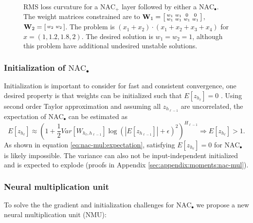\begin{figure}[h]
\caption{RMS loss curvature for a $\mathrm{NAC}_{+}$ layer followed by either a $\mathrm{NAC}_{\bullet}$. The weight matrices constrained are to $\mathbf{W}_1 = \left[\protect\begin{smallmatrix}
w_1 & w_1 & 0 & 0 \\
w_1 & w_1 & w_1 & w_1
\protect\end{smallmatrix}\right]$, $\mathbf{W}_2 = \left[\protect\begin{smallmatrix}
w_2 & w_2
\protect\end{smallmatrix}\right]$. The problem is $(x_1 + x_2) \cdot (x_1 + x_2 + x_3 + x_4)$ for $x = \left(1, 1.2, 1.8, 2\right)$. The desired solution is $w_1 = w_2 = 1$, although this problem have additional undesired unstable solutions.}
\label{fig:nac-mul-eps-issue}
\end{figure}

\subsubsection{Initialization of $\mathrm{NAC}_{\bullet}$}
Initialization is important to consider for fast and consistent convergence, one desired property is that weights can be initialized such that $E[z_{h_\ell}] = 0$ \cite{glorot-initialization}. Using second order Taylor approximation and assuming all $z_{h_{\ell-1}}$ are uncorrelated, the expectation of $\mathrm{NAC}_{\bullet}$ can be estimated as
\begin{equation}
E[z_{h_\ell}] \approx \left(1 + \frac{1}{2} Var[W_{h_\ell, h_{\ell-1}}] \log(|E[z_{h_{\ell-1}}]| + \epsilon)^2\right)^{H_{\ell-1}} \Rightarrow E[z_{h_\ell}] > 1.
\label{eq:nac-mul:expectation}
\end{equation}
As shown in equation \ref{eq:nac-mul:expectation}, satisfying $E[z_{h_\ell}] = 0$ for $\mathrm{NAC}_{\bullet}$ is likely impossible. The variance can also not be input-independent initialized and is expected to explode (proofs in Appendix \ref{sec:appendix:moments:nac-mul}).

\subsubsection{Neural multiplication unit}
To solve the the gradient and initialization challenges for $\mathrm{NAC}_{\bullet}$ we propose a new neural multiplication unit (NMU):

